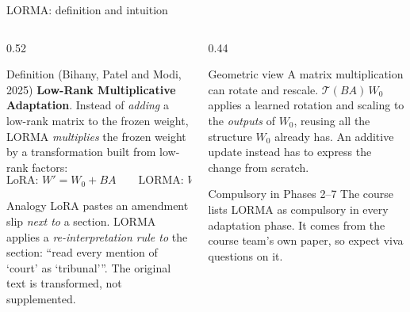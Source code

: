 \documentclass[aspectratio=169,11pt]{beamer}
\begin{document}
\begin{frame}{LORMA: definition and intuition}
  \begin{columns}[T]
    \begin{column}{0.52\textwidth}
      \begin{block}{Definition (Bihany, Patel and Modi, 2025)}
        \small
        \textbf{Low-Rank Multiplicative Adaptation}. Instead of \emph{adding} a low-rank matrix to the frozen weight, LORMA \emph{multiplies} the frozen weight by a transformation built from low-rank factors:
        \[
          \text{LoRA: } W'=W_0+BA\qquad\text{LORMA: } W'=\mathcal{T}(BA)\,W_0
        \]
      \end{block}
      \begin{exampleblock}{Analogy}
        \small
        LoRA pastes an amendment slip \emph{next to} a section. LORMA applies a \emph{re-interpretation rule to} the section: ``read every mention of `court' as `tribunal'''.
        The original text is transformed, not supplemented.
      \end{exampleblock}
    \end{column}
    \begin{column}{0.44\textwidth}
      \begin{block}{Geometric view}
        \small
        A matrix multiplication can rotate and rescale.
        $\mathcal{T}(BA)\,W_0$ applies a learned rotation and scaling to the \emph{outputs} of $W_0$, reusing all the structure $W_0$ already has.
        An additive update instead has to express the change from scratch.
      \end{block}
      \begin{alertblock}{Compulsory in Phases 2--7}
        \small
        The course lists LORMA as compulsory in every adaptation phase. It comes from the course team's own paper, so expect viva questions on it.
      \end{alertblock}
    \end{column}
  \end{columns}
\end{frame}
\end{document}
